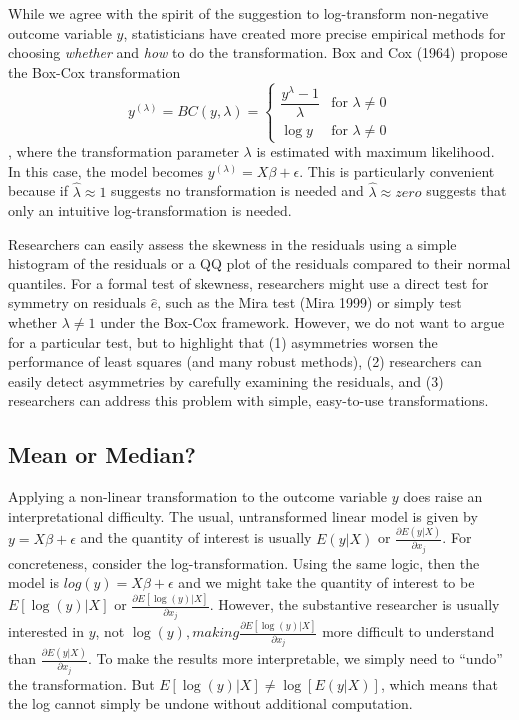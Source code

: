 \documentclass[12pt]{article}
\begin{document}
While we agree with the spirit of the suggestion to log-transform non-negative outcome variable $y$, statisticians have created more precise empirical methods for choosing \textit{whether} and \textit{how} to do the transformation. 
Box and Cox (1964) propose the Box-Cox transformation 
\begin{displaymath}
   y^{(\lambda)} = BC(y, \lambda) = \left\{
     \begin{array}{lr}
       \dfrac{y^\lambda - 1}{\lambda} & \text{for } \lambda \neq 0\\
       \log y & \text{for } \lambda \neq 0
     \end{array}
   \right.
\end{displaymath},
\noindent where the transformation parameter $\lambda$ is estimated with maximum likelihood. 
In this case, the model becomes $y^{(\lambda)} = X\beta + \epsilon$. 
This is particularly convenient because if $\hat{\lambda} \approx 1$ suggests no transformation is needed and $\hat{\lambda} \approx zero$ suggests that only an intuitive log-transformation is needed.

Researchers can easily assess the skewness in the residuals using a simple histogram of the residuals or a QQ plot of the residuals compared to their normal quantiles. 
For a formal test of skewness, researchers might use a direct test for symmetry on residuals $\hat{e}$, such as the Mira test (Mira 1999) or simply test whether $\lambda \neq 1$ under the Box-Cox framework. 
However, we do not want to argue for a particular test, but to highlight that (1) asymmetries worsen the performance of least squares (and many robust methods), (2) researchers can easily detect asymmetries by carefully examining the residuals, and (3) researchers can address this problem with simple, easy-to-use transformations.

\subsection*{Mean or Median?}

Applying a non-linear transformation to the outcome variable $y$ does raise an interpretational difficulty. 
The usual, untransformed linear model is given by $y = X\beta + \epsilon$ and the quantity of interest is usually $E(y | X)$ or $\frac{\partial E(y | X)}{\partial x_j}$. 
For concreteness, consider the log-transformation. 
Using the same logic, then the model is $log(y) = X\beta + \epsilon$ and we might take the quantity of interest to be $E[\log(y) | X]$ or $\frac{\partial E[\log(y) | X]}{\partial x_j}$. 
However, the substantive researcher is usually interested in $y$, not $\log(y), making $$\frac{\partial E[\log(y) | X]}{\partial x_j}$ more difficult to understand than $\frac{\partial E(y | X)}{\partial x_j}$. 
To make the results more interpretable, we simply need to ``undo'' the transformation. 
But $E[\log(y) | X] \neq \log [E(y | X)]$, which means that the log cannot simply be undone without additional computation.
\end{document}
